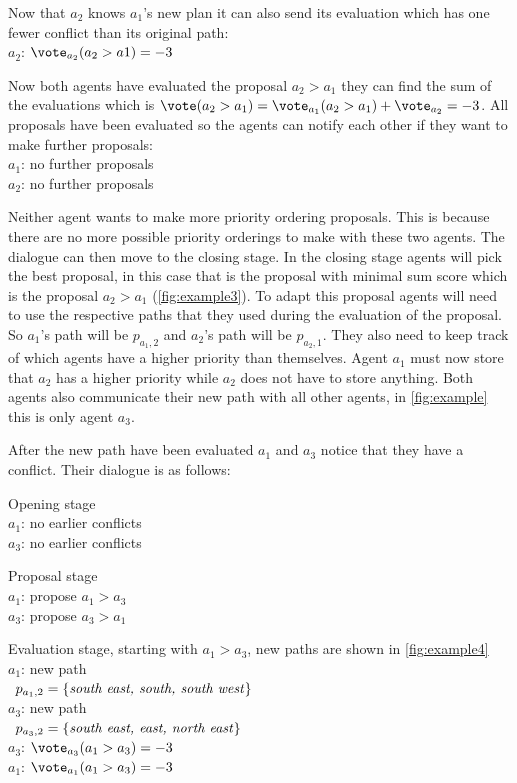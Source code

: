 Now that $a_2$ knows $a_1$'s new plan it can also send its evaluation which has 
one fewer conflict than its original path:
\\ \-\qquad $a_2$: $\vote_{a_2}(a_2 > a1) = -3$

Now both agents have evaluated the proposal $a_2 > a_1$ they can find the sum 
of the evaluations which is $\vote(a_2 > a_1) = \vote_{a_1}(a_2 > a_1) + 
\vote_{a_2} = -3$. All proposals have been evaluated so the agents can notify 
each other if they want to make further proposals:
\\ \-\quad $a_1$: no further proposals
\\ \-\quad $a_2$: no further proposals

Neither agent wants to make more priority ordering proposals. This is because 
there are no more possible priority orderings to make with these two agents. 
The dialogue can then move to the closing stage. In the closing stage agents 
will pick the best proposal, in this case that is the proposal with minimal 
sum score which is the proposal $a_2 > a_1$ (\autoref{fig:example3}). To adapt 
this proposal agents will need to use the respective paths that they used 
during the evaluation of the proposal. So $a_1$'s path will be $p_{a_1,2}$ and 
$a_2$'s path will be $p_{a_2,1}$. They also need to keep track of which agents 
have a higher priority than themselves. Agent $a_1$ must now store that $a_2$ 
has a higher priority while $a_2$ does not have to store anything. Both agents 
also communicate their new path with all other agents, in \autoref{fig:example} 
this is only agent $a_3$.

After the new path have been evaluated $a_1$ and $a_3$ notice that they have a 
conflict. Their dialogue is as follows:

Opening stage
\\ \-\qquad $a_1$: no earlier conflicts
\\ \-\qquad $a_3$: no earlier conflicts

Proposal stage
\\ \-\qquad $a_1$: propose $a_1 > a_3$
\\ \-\qquad $a_3$: propose $a_3 > a_1$

Evaluation stage, starting with $a_1 > a_3$, new paths are shown in 
\autoref{fig:example4}
\\ \-\qquad $a_1$: new path
\\ \-\qquad\quad\,\; $p_{a_1,2} = \{\text{\emph{south east, south, south 
west}}\}$
\\ \-\qquad $a_3$: new path
\\ \-\qquad\quad\,\; $p_{a_3,2} = \{\text{\emph{south east, east, north 
east}}\}$
\\ \-\qquad $a_3$: $\vote_{a_3}(a_1 > a_3) = -3$
\\ \-\qquad $a_1$: $\vote_{a_1}(a_1 > a_3) = -3$

